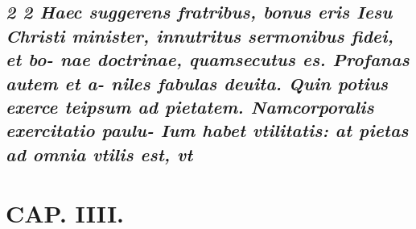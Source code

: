 \documentclass{article}
\begin{document}
\begin{pages}
\subsection*{\textit{2 2 Haec suggerens fratribus, bonus eris Iesu Christi minister, innutritus sermonibus fidei, et bo- nae doctrinae, quamsecutus es. Profanas autem et a- niles fabulas deuita. Quin potius exerce teipsum ad pietatem. Namcorporalis exercitatio paulu- Ium habet vtilitatis: at pietas ad omnia vtilis est, vt }}
\section*{CAP. IIII. }
\marginpar{[ p.49 ]}
{}

\end{pages}
\end{document}

